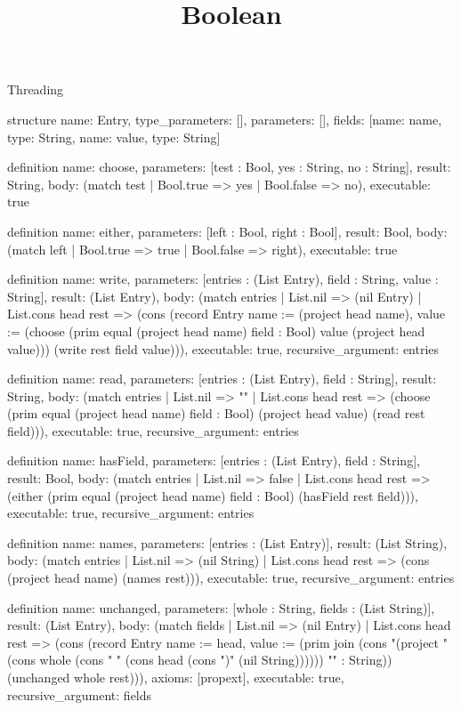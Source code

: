 \begin{lexlean}{Threading}
\title{Boolean}
\begin{semanticmodule}
structure{
  name: Entry,
  type_parameters: [],
  parameters: [],
  fields: [{name: name, type: String}, {name: value, type: String}]
}

definition{
  name: choose,
  parameters: [test : Bool, yes : String, no : String],
  result: String,
  body: (match test | Bool.true => yes | Bool.false => no),
  executable: true
}

definition{
  name: either,
  parameters: [left : Bool, right : Bool],
  result: Bool,
  body: (match left | Bool.true => true | Bool.false => right),
  executable: true
}

definition{
  name: write,
  parameters: [entries : (List Entry), field : String, value : String],
  result: (List Entry),
  body: (match entries
    | List.nil => (nil Entry)
    | List.cons head rest => (cons (record Entry {name := (project head name), value := (choose (prim equal (project head name) field : Bool) value (project head value))}) (write rest field value))),
  executable: true,
  recursive_argument: entries
}

definition{
  name: read,
  parameters: [entries : (List Entry), field : String],
  result: String,
  body: (match entries
    | List.nil => ""
    | List.cons head rest => (choose (prim equal (project head name) field : Bool) (project head value) (read rest field))),
  executable: true,
  recursive_argument: entries
}

definition{
  name: hasField,
  parameters: [entries : (List Entry), field : String],
  result: Bool,
  body: (match entries
    | List.nil => false
    | List.cons head rest => (either (prim equal (project head name) field : Bool) (hasField rest field))),
  executable: true,
  recursive_argument: entries
}

definition{
  name: names,
  parameters: [entries : (List Entry)],
  result: (List String),
  body: (match entries
    | List.nil => (nil String)
    | List.cons head rest => (cons (project head name) (names rest))),
  executable: true,
  recursive_argument: entries
}

definition{
  name: unchanged,
  parameters: [whole : String, fields : (List String)],
  result: (List Entry),
  body: (match fields
    | List.nil => (nil Entry)
    | List.cons head rest => (cons (record Entry {name := head, value := (prim join (cons "(project " (cons whole (cons " " (cons head (cons ")" (nil String)))))) "" : String)}) (unchanged whole rest))),
  axioms: [propext],
  executable: true,
  recursive_argument: fields
}


\end{semanticmodule}
\end{lexlean}

